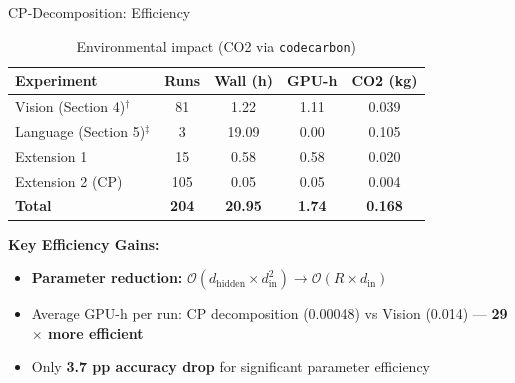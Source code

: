 \begin{frame}{CP-Decomposition: Efficiency}
    \begin{center}
        \begin{table}
            \centering
            \small
            \begin{tabular}{lcccc}
                \toprule
                Experiment & Runs & Wall (h) & GPU-h & CO2 (kg) \\
                \midrule
                Vision (Section 4)$^\dagger$ & 81 & 1.22 & 1.11 & 0.039 \\
                Language (Section 5)$^\ddagger$ & 3 & 19.09 & 0.00 & 0.105 \\
                Extension 1 & 15 & 0.58 & 0.58 & 0.020 \\
                Extension 2 (CP) & 105 & 0.05 & 0.05 & 0.004 \\
                \midrule
                \textbf{Total} & \textbf{204} & \textbf{20.95} & \textbf{1.74} & \textbf{0.168} \\
                \bottomrule
            \end{tabular}
            \caption{Environmental impact (CO2 via \texttt{codecarbon})}
        \end{table}
        
        
        
    \end{center}
    
    \vspace{0.3cm}
    \textbf{Key Efficiency Gains:}
    \begin{itemize}
        \item \textbf{Parameter reduction:} $\mathcal{O}(d_{\text{hidden}} \times d_{\text{in}}^2) \to \mathcal{O}(R \times d_{\text{in}})$
        \item Average GPU-h per run: CP decomposition (0.00048) vs Vision (0.014) --- \textbf{29$\times$ more efficient}
        \item Only \textbf{3.7 pp accuracy drop} for significant parameter efficiency
    \end{itemize}
\end{frame}

